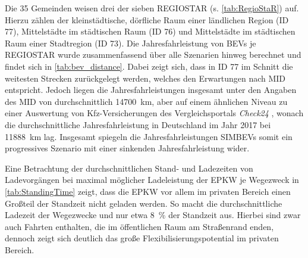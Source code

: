 Die \num{35} Gemeinden weisen drei der sieben \gls{REGIOSTAR} (s. \autoref{tab:RegioStaR}) auf.
Hierzu zählen der kleinstädtische, dörfliche Raum einer ländlichen Region (\gls{ID} \num{77}), Mittelstädte im städtischen Raum (\gls{ID} \num{76}) und Mittelstädte im städtischen Raum einer Stadtregion (\gls{ID} \num{73}).
Die Jahresfahrleistung von \glspl{BEV} je \gls{REGIOSTAR} wurde zusammenfassend über alle Szenarien hinweg berechnet und findet sich in \autoref{tab:bev_distance}.
Dabei zeigt sich, dass in \gls{ID} \num{77} im Schnitt die weitesten Strecken zurückgelegt werden, welches den Erwartungen nach \gls{MID} \cite{Nobis2019} entspricht.
Jedoch liegen die Jahresfahrleistungen insgesamt unter den Angaben des \gls{MID} von durchschnittlich \SI{14700}{\km}, aber auf einem ähnlichen Niveau zu einer Auswertung von Kfz-Versicherungen des Vergleichsportals \textit{Check24} \cite{CHECK24GmbH2018}, wonach die durchschnittliche Jahresfahrleistung in Deutschland im Jahr \num{2017} bei \SI{11888}{\km} lag.
Insgesamt spiegeln die Jahresfahrleistungen \glspl{SIMBEV} somit ein progressives Szenario mit einer sinkenden Jahresfahrleistung wider.




Eine Betrachtung der durchschnittlichen Stand- und Ladezeiten von Ladevorgängen bei maximal möglicher Ladeleistung der \gls{EPKW} je Wegezweck in \autoref{tab:StandingTime} zeigt, dass die \gls{EPKW} vor allem im privaten Bereich einen Großteil der Standzeit nicht geladen werden.
So macht die durchschnittliche Ladezeit der Wegezwecke \nH und \Arbeit nur etwa \SI{8}{\percent} der Standzeit aus.
Hierbei sind zwar auch Fahrten enthalten, die im öffentlichen Raum am Straßenrand enden, dennoch zeigt sich deutlich das große Flexibilisierungspotential im privaten Bereich.



